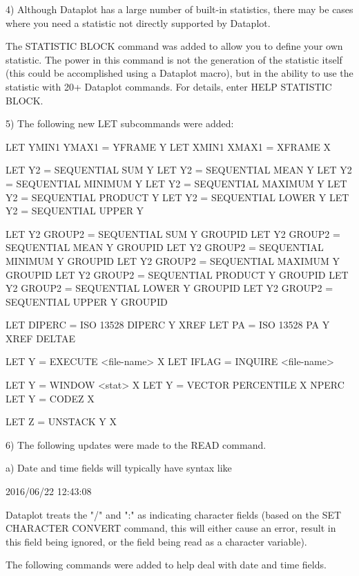  4) Although Dataplot has a large number of built-in statistics,
    there may be cases where you need a statistic not directly
    supported by Dataplot.

    The STATISTIC BLOCK command was added to allow you to define
    your own statistic.  The power in this command is not the
    generation of the statistic itself (this could be accomplished
    using a Dataplot macro), but in the ability to use the
    statistic with 20+ Dataplot commands.  For details, enter
    HELP STATISTIC BLOCK.

 5) The following new LET subcommands were added:

       LET YMIN1 YMAX1 = YFRAME Y
       LET XMIN1 XMAX1 = XFRAME X

       LET Y2 = SEQUENTIAL SUM Y
       LET Y2 = SEQUENTIAL MEAN Y
       LET Y2 = SEQUENTIAL MINIMUM Y
       LET Y2 = SEQUENTIAL MAXIMUM Y
       LET Y2 = SEQUENTIAL PRODUCT Y
       LET Y2 = SEQUENTIAL LOWER Y
       LET Y2 = SEQUENTIAL UPPER Y

       LET Y2 GROUP2 = SEQUENTIAL SUM Y GROUPID
       LET Y2 GROUP2 = SEQUENTIAL MEAN Y GROUPID
       LET Y2 GROUP2 = SEQUENTIAL MINIMUM Y GROUPID
       LET Y2 GROUP2 = SEQUENTIAL MAXIMUM Y GROUPID
       LET Y2 GROUP2 = SEQUENTIAL PRODUCT Y GROUPID
       LET Y2 GROUP2 = SEQUENTIAL LOWER Y GROUPID
       LET Y2 GROUP2 = SEQUENTIAL UPPER Y GROUPID

       LET DIPERC = ISO 13528 DIPERC Y XREF
       LET PA     = ISO 13528 PA     Y XREF DELTAE

       LET Y = EXECUTE <file-name> X
       LET IFLAG = INQUIRE <file-name>

       LET Y = WINDOW <stat> X
       LET Y = VECTOR PERCENTILE X NPERC
       LET Y = CODEZ X

       LET Z = UNSTACK Y X

 6) The following updates were made to the READ command.

    a) Date and time fields will typically have syntax like

         2016/06/22
         12:43:08

       Dataplot treats the "/" and ":" as indicating character fields
       (based on the SET CHARACTER CONVERT command, this will either cause
       an error, result in this field being ignored, or the field being
       read as a character variable).

       The following commands were added to help deal with date and
       time fields.

